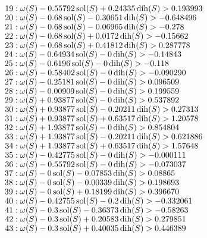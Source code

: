 $19:  \omega(S) - 0.55792 \operatorname{sol}(S) + 0.24335 \operatorname{dih}(S) > 0.193993$\newline
$20:  \omega(S) - 0.68 \operatorname{sol}(S) - 0.30651 \operatorname{dih}(S) > -0.648496$\newline
$21:  \omega(S) - 0.68 \operatorname{sol}(S) - 0.06965 \operatorname{dih}(S) > -0.278$\newline
$22:  \omega(S) - 0.68 \operatorname{sol}(S) + 0.0172 \operatorname{dih}(S) > -0.15662$\newline
$23:  \omega(S) - 0.68 \operatorname{sol}(S) + 0.41812 \operatorname{dih}(S) > 0.287778$\newline
$24:  \omega(S) - 0.64934 \operatorname{sol}(S) - 0 \operatorname{dih}(S) > -0.14843$\newline
$25:  \omega(S) - 0.6196 \operatorname{sol}(S) - 0 \operatorname{dih}(S) > -0.118$\newline
$26:  \omega(S) - 0.58402 \operatorname{sol}(S) - 0 \operatorname{dih}(S) > -0.090290$\newline
$27:  \omega(S) - 0.25181 \operatorname{sol}(S) - 0 \operatorname{dih}(S) > 0.096509$\newline
$28:  \omega(S) - 0.00909 \operatorname{sol}(S) - 0 \operatorname{dih}(S) > 0.199559$\newline
$29:  \omega(S) + 0.93877 \operatorname{sol}(S) - 0 \operatorname{dih}(S) > 0.537892$\newline
$30:  \omega(S) + 0.93877 \operatorname{sol}(S) - 0.20211 \operatorname{dih}(S) > 0.27313$\newline
$31:  \omega(S) + 0.93877 \operatorname{sol}(S) + 0.63517 \operatorname{dih}(S) > 1.20578$\newline
$32:  \omega(S) + 1.93877 \operatorname{sol}(S) - 0 \operatorname{dih}(S) > 0.854804$\newline
$33:  \omega(S) + 1.93877 \operatorname{sol}(S) - 0.20211 \operatorname{dih}(S) > 0.621886$\newline
$34:  \omega(S) + 1.93877 \operatorname{sol}(S) + 0.63517 \operatorname{dih}(S) > 1.57648$\newline
$35:  \omega(S) - 0.42775 \operatorname{sol}(S) - 0 \operatorname{dih}(S) > -0.000111$\newline
$36:  \omega(S) - 0.55792 \operatorname{sol}(S) - 0 \operatorname{dih}(S) > -0.073037$\newline
$37:  \omega(S) - 0 \operatorname{sol}(S) - 0.07853 \operatorname{dih}(S) > 0.08865$\newline
$38:  \omega(S) - 0 \operatorname{sol}(S) - 0.00339 \operatorname{dih}(S) > 0.198693$\newline
$39:  \omega(S) - 0 \operatorname{sol}(S) + 0.18199 \operatorname{dih}(S) > 0.396670$\newline
$40:  \omega(S) - 0.42755 \operatorname{sol}(S) - 0.2 \operatorname{dih}(S) > -0.332061$\newline
$41:  \omega(S) - 0.3 \operatorname{sol}(S) - 0.36373 \operatorname{dih}(S) > -0.58263$\newline
$42:  \omega(S) - 0.3 \operatorname{sol}(S) + 0.20583 \operatorname{dih}(S) > 0.279851$\newline
$43:  \omega(S) - 0.3 \operatorname{sol}(S) + 0.40035 \operatorname{dih}(S) > 0.446389$\newline
